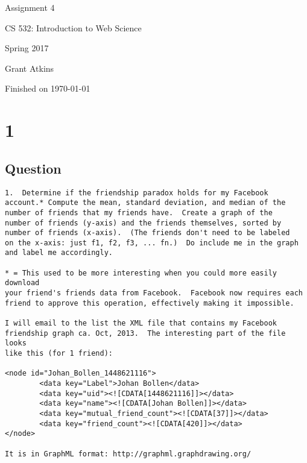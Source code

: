 \documentclass[letterpaper,11pt]{article}
\begin{document}
\begin{titlepage}

\begin{center}

\Huge{Assignment 4}

\Large{CS 532:  Introduction to Web Science}

\Large{Spring 2017}

\Large{Grant Atkins}

\Large Finished on \today

\end{center}

\end{titlepage}

\newpage


\section*{1}


\subsection*{Question}

\begin{verbatim}
1.  Determine if the friendship paradox holds for my Facebook
account.* Compute the mean, standard deviation, and median of the
number of friends that my friends have.  Create a graph of the
number of friends (y-axis) and the friends themselves, sorted by
number of friends (x-axis).  (The friends don't need to be labeled
on the x-axis: just f1, f2, f3, ... fn.)  Do include me in the graph
and label me accordingly.

* = This used to be more interesting when you could more easily download
your friend's friends data from Facebook.  Facebook now requires each
friend to approve this operation, effectively making it impossible.

I will email to the list the XML file that contains my Facebook
friendship graph ca. Oct, 2013.  The interesting part of the file looks
like this (for 1 friend):

<node id="Johan_Bollen_1448621116">
        <data key="Label">Johan Bollen</data>
        <data key="uid"><![CDATA[1448621116]]></data>
        <data key="name"><![CDATA[Johan Bollen]]></data>
        <data key="mutual_friend_count"><![CDATA[37]]></data>
        <data key="friend_count"><![CDATA[420]]></data>
</node>

It is in GraphML format: http://graphml.graphdrawing.org/
\end{verbatim}
\end{document}
